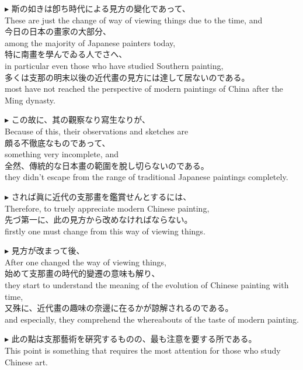 \documentclass{ctexart}
\makeatletter
\newcommand*{\shifttext}[1]{%
  \settowidth{\@tempdima}{#1}%
  \hspace{-\@tempdima}#1%
}
\newcommand{\plabel}[1]{%
\shifttext{\textbf{#1}\quad}%
}
\makeatother
\begin{document}
\vspace{1em}
\plabel{$\blacktriangleright$}%
斯の如きは卽ち時代による見方の變化であって、\\
These are just the change of way of viewing things due to the time, and\\
今日の日本の畫家の大部分、\\
among the majority of Japanese painters today,\\
特に南畫を學んでゐる人でさへ、\\
in particular even those who have studied Southern painting,\\
多くは支那の明末以後の近代畫の見方には達して居ないのである。\\
most have not reached the perspective of modern paintings of China after the Ming dynasty.

\vspace{1em}
\plabel{$\blacktriangleright$}%
この故に、其の觀察なり寫生なりが、\\
Because of this, their observations and sketches are\\
頗る不徹底なものであって、\\
something very incomplete, and\\
全然、傳統的な日本畫の範圍を脫し切らないのである。\\
they didn't escape from the range of traditional Japanese paintings completely.

\vspace{1em}
\plabel{$\blacktriangleright$}%
されば眞に近代の支那畫を鑑賞せんとするには、\\
Therefore, to truely appreciate modern Chinese painting,\\
先づ第一に、此の見方から改めなければならない。\\
firstly one must change from this way of viewing things.

\vspace{1em}
\plabel{$\blacktriangleright$}%
見方が改まって後、\\
After one changed the way of viewing things,\\
始めて支那畫の時代的變遷の意味も解り、\\
they start to understand the meaning of the evolution of Chinese painting with time,\\
又殊に、近代畫の趣味の奈邊に在るかが諒解されるのである。\\
and especially, they comprehend the whereabouts of the taste of modern painting. 

\vspace{1em}
\plabel{$\blacktriangleright$}%
此の點は支那藝術を硏究するものの、最も注意を要する所である。\\
This point is something that requires the most attention for those who study Chinese art.
\end{document}
